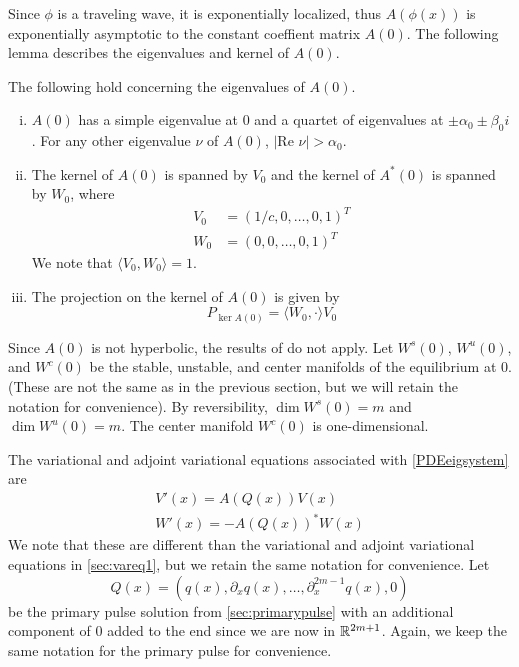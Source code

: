 \documentclass[thesis.tex]{subfiles}
\begin{document}
Since $\phi$ is a traveling wave, it is exponentially localized, thus $A(\phi(x))$ is exponentially asymptotic to the constant coeffient matrix $A(0)$. The following lemma describes the eigenvalues and kernel of $A(0)$.

\begin{lemma}\label{eigA0lemma}
The following hold concerning the eigenvalues of $A(0)$.
\begin{enumerate}[(i)]
\item $A(0)$ has a simple eigenvalue at 0 and a quartet of eigenvalues at $\pm \alpha_0 \pm \beta_0 i$. For any other eigenvalue $\nu$ of $A(0)$, $|\text{Re }\nu| > \alpha_0$.
\item The kernel of $A(0)$ is spanned by $V_0$ and the kernel of $A^*(0)$ is spanned by $W_0$, where
\begin{align}
V_0 &= (1/c, 0, \dots, 0, 1)^T \label{V0} \\
W_0 &= (0, 0, \dots, 0, 1)^T \label{W0}
\end{align}
We note that $\langle V_0, W_0 \rangle = 1$.
\item The projection on the kernel of $A(0)$ is given by
\begin{equation}\label{projkernelA0}
P_{\ker A(0)} = \langle W_0, \cdot \rangle V_0
\end{equation}
\end{enumerate} 
\end{lemma}

Since $A(0)$ is not hyperbolic, the results of \cite{Sandstede1998} do not apply. Let $W^s(0)$, $W^u(0)$, and $W^c(0)$ be the stable, unstable, and center manifolds of the equilibrium at 0. (These are not the same as in the previous section, but we will retain the notation for convenience). By reversibility, $\dim W^s(0) = m$ and $\dim W^u(0) = m$. The center manifold $W^c(0)$ is one-dimensional.

The variational and adjoint variational equations associated with \cref{PDEeigsystem} are
\begin{align}
V'(x) = A(Q(x)) V(x) \label{vareq2} \\
W'(x) = -A(Q(x))^* W(x) \label{adjvareq2}
\end{align}
We note that these are different than the variational and adjoint variational equations in \cref{sec:vareq1}, but we retain the same notation for convenience. Let 
\[
Q(x) = (q(x), \partial_x q(x), \dots, \partial_x^{2m-1} q(x), 0)\]
be the primary pulse solution from \cref{sec:primarypulse} with an additional component of 0 added to the end since we are now in $\mathbb{R}^{2m+1}$. Again, we keep the same notation for the primary pulse for convenience. 
\end{document}
